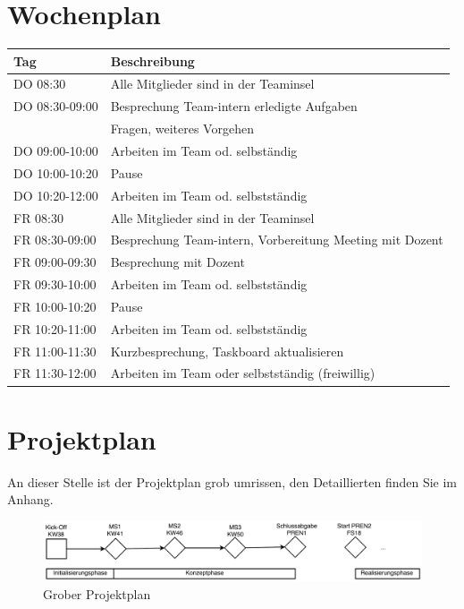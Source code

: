 \documentclass[a4paper]{report}
\begin{document}
\section{Wochenplan}
\begin{tabular}{|p{}|p{}|}
	\hline
	\textbf{Tag} & \textbf{Beschreibung} \\
	\hline
	DO 08:30 & Alle Mitglieder sind in der Teaminsel \\
	\hline
	DO 08:30-09:00 & Besprechung Team-intern erledigte Aufgaben \\
	& Fragen, weiteres Vorgehen \\
	\hline
	DO 09:00-10:00 & Arbeiten im Team od. selbständig \\
	\hline
	DO 10:00-10:20 & Pause \\
	\hline
	DO 10:20-12:00 & Arbeiten im Team od. selbstständig \\
	\hline
	FR 08:30 & Alle Mitglieder sind in der Teaminsel \\
	\hline
	FR 08:30-09:00 & Besprechung Team-intern, Vorbereitung Meeting mit Dozent \\
	\hline
	FR 09:00-09:30& Besprechung mit Dozent \\
	\hline
	FR 09:30-10:00 & Arbeiten im Team od. selbstständig \\
	\hline
	FR 10:00-10:20 & Pause \\
	\hline
	FR 10:20-11:00 & Arbeiten im Team od. selbstständig \\
	\hline
	FR 11:00-11:30 & Kurzbesprechung, Taskboard aktualisieren \\
	\hline
	FR 11:30-12:00 & Arbeiten im Team oder selbstständig (freiwillig)\\
	\hline
\end{tabular}

\section{Projektplan}

An dieser Stelle ist der Projektplan grob umrissen, den Detaillierten finden Sie im Anhang.

\begin{figure}[h!]
	\includegraphics[width=\linewidth,keepaspectratio]{Rahmenplan}
	\caption{Grober Projektplan}
	\label{fig:GrobProjekt}
\end{figure}
\end{document}
